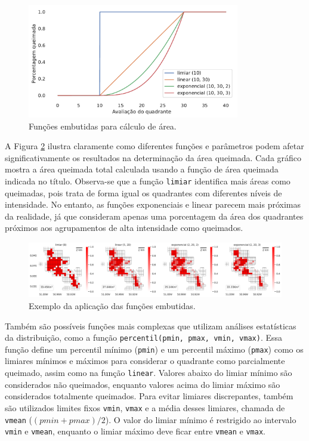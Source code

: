 \documentclass[cic,tc]{iiufrgs}
\begin{document}
\begin{figure}[!htb]
    \caption{Funções embutidas para cálculo de área.}
    \begin{center}
        \includegraphics[width=25em]{eval_func_built_in}
    \end{center}
    \label{fig:eval_func_built_in}
\end{figure}

A Figura \ref{fig:aplicacao_funcoes_built_in} ilustra claramente como diferentes funções e parâmetros podem afetar significativamente os resultados na determinação da área queimada. Cada gráfico mostra a área queimada total calculada usando a função de área queimada indicada no título. Observa-se que a função \texttt{limiar} identifica mais áreas como queimadas, pois trata de forma igual os quadrantes com diferentes níveis de intensidade. No entanto, as funções exponenciais e linear parecem mais próximas da realidade, já que consideram apenas uma porcentagem da área dos quadrantes próximos aos agrupamentos de alta intensidade como queimados.

\begin{figure}[!htb]
    \caption{Exemplo da aplicação das funções embutidas.}
    \begin{center}
        \includegraphics[width=35em]{aplicacao_funcoes_built_in}
    \end{center}
    \label{fig:aplicacao_funcoes_built_in}
\end{figure}

Também são possíveis funções mais complexas que utilizam análises estatísticas da distribuição, como a função \texttt{percentil(pmin, pmax, vmin, vmax)}. Essa função define um percentil mínimo (\texttt{pmin}) e um percentil máximo (\texttt{pmax}) como os limiares mínimos e máximos para considerar o quadrante como parcialmente queimado, assim como na função \texttt{linear}. Valores abaixo do limiar mínimo são considerados não queimados, enquanto valores acima do limiar máximo são considerados totalmente queimados. Para evitar limiares discrepantes, também são utilizados limites fixos \texttt{vmin}, \texttt{vmax} e a média desses limiares, chamada de \texttt{vmean} ($(pmin + pmax) / 2$). O valor do limiar mínimo é restrigido ao intervalo \texttt{vmin} e \texttt{vmean}, enquanto o limiar máximo deve ficar entre \texttt{vmean} e \texttt{vmax}. 
\end{document}
